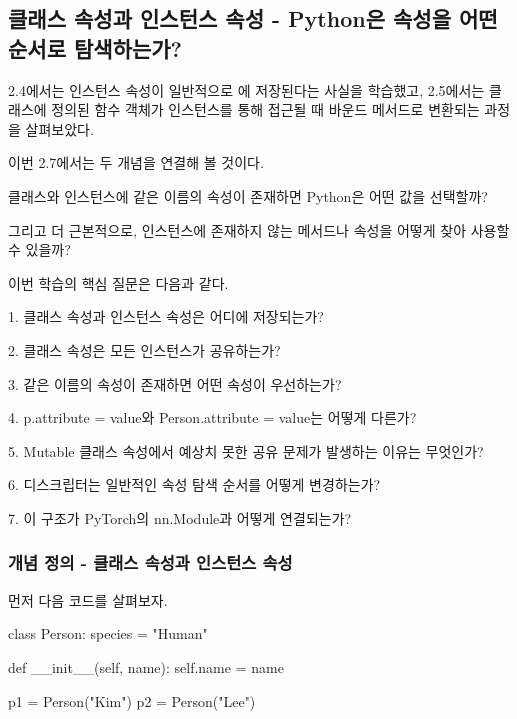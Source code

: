 

\subsection{클래스 속성과 인스턴스 속성 - Python은 속성을 어떤 순서로 탐색하는가?}

2.4에서는 인스턴스 속성이 일반적으로 에 저장된다는 사실을 학습했고, 2.5에서는 클래스에 정의된 함수 객체가 인스턴스를 통해 접근될 때 바운드 메서드로 변환되는 과정을 살펴보았다.

이번 2.7에서는 두 개념을 연결해 볼 것이다.

클래스와 인스턴스에 같은 이름의 속성이 존재하면 Python은 어떤 값을 선택할까?

그리고 더 근본적으로, 인스턴스에 존재하지 않는 메서드나 속성을 어떻게 찾아 사용할 수 있을까?

이번 학습의 핵심 질문은 다음과 같다.

\begin{dhksmry}
1. 클래스 속성과 인스턴스 속성은 어디에 저장되는가?

2. 클래스 속성은 모든 인스턴스가 공유하는가?

3. 같은 이름의 속성이 존재하면 어떤 속성이 우선하는가?

4. p.attribute = value와 Person.attribute = value는 어떻게 다른가?

5. Mutable 클래스 속성에서 예상치 못한 공유 문제가 발생하는 이유는 무엇인가?

6. 디스크립터는 일반적인 속성 탐색 순서를 어떻게 변경하는가?

7. 이 구조가 PyTorch의 nn.Module과 어떻게 연결되는가?
\end{dhksmry}

\subsubsection{개념 정의 - 클래스 속성과 인스턴스 속성}

먼저 다음 코드를 살펴보자.

\begin{dhkcode}
class Person:
    species = "Human"

    def __init__(self, name):
        self.name = name

p1 = Person("Kim")
p2 = Person("Lee")
\end{dhkcode}

